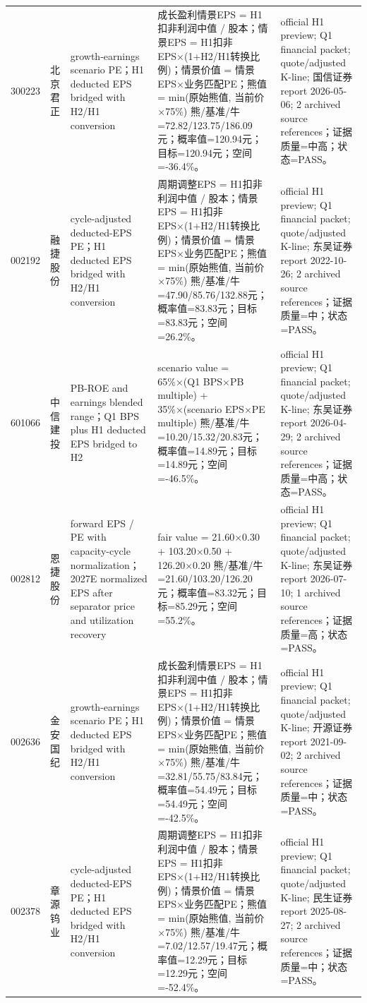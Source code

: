 \begin{longtable}{L{0.85cm}L{1.55cm}L{2.25cm}L{6.0cm}L{4.0cm}}
300223 & 北京君正 & growth-earnings scenario PE；H1 deducted EPS bridged with H2/H1 conversion & 成长盈利情景EPS = H1扣非利润中值 / 股本；情景EPS = H1扣非EPS×(1+H2/H1转换比例)；情景价值 = 情景EPS×业务匹配PE；熊值 = min(原始熊值, 当前价×75\%) 熊/基准/牛=72.82/123.75/186.09元；概率值=120.94元；目标=120.94元；空间=-36.4\%。 & official H1 preview; Q1 financial packet; quote/adjusted K-line; 国信证券 report 2026-05-06; 2 archived source references；证据质量=中高；状态=PASS。 \\
002192 & 融捷股份 & cycle-adjusted deducted-EPS PE；H1 deducted EPS bridged with H2/H1 conversion & 周期调整EPS = H1扣非利润中值 / 股本；情景EPS = H1扣非EPS×(1+H2/H1转换比例)；情景价值 = 情景EPS×业务匹配PE；熊值 = min(原始熊值, 当前价×75\%) 熊/基准/牛=47.90/85.76/132.88元；概率值=83.83元；目标=83.83元；空间=26.2\%。 & official H1 preview; Q1 financial packet; quote/adjusted K-line; 东吴证券 report 2022-10-26; 2 archived source references；证据质量=中；状态=PASS。 \\
601066 & 中信建投 & PB-ROE and earnings blended range；Q1 BPS plus H1 deducted EPS bridged to H2 & scenario value = 65\%×(Q1 BPS×PB multiple) + 35\%×(scenario EPS×PE multiple) 熊/基准/牛=10.20/15.32/20.83元；概率值=14.89元；目标=14.89元；空间=-46.5\%。 & official H1 preview; Q1 financial packet; quote/adjusted K-line; 东吴证券 report 2026-04-29; 2 archived source references；证据质量=中高；状态=PASS。 \\
002812 & 恩捷股份 & forward EPS / PE with capacity-cycle normalization；2027E normalized EPS after separator price and utilization recovery & fair value = 21.60×0.30 + 103.20×0.50 + 126.20×0.20 熊/基准/牛=21.60/103.20/126.20元；概率值=83.32元；目标=85.29元；空间=55.2\%。 & official H1 preview; Q1 financial packet; quote/adjusted K-line; 东吴证券 report 2026-07-10; 1 archived source references；证据质量=高；状态=PASS。 \\
002636 & 金安国纪 & growth-earnings scenario PE；H1 deducted EPS bridged with H2/H1 conversion & 成长盈利情景EPS = H1扣非利润中值 / 股本；情景EPS = H1扣非EPS×(1+H2/H1转换比例)；情景价值 = 情景EPS×业务匹配PE；熊值 = min(原始熊值, 当前价×75\%) 熊/基准/牛=32.81/55.75/83.84元；概率值=54.49元；目标=54.49元；空间=-42.5\%。 & official H1 preview; Q1 financial packet; quote/adjusted K-line; 开源证券 report 2021-09-02; 2 archived source references；证据质量=中；状态=PASS。 \\
002378 & 章源钨业 & cycle-adjusted deducted-EPS PE；H1 deducted EPS bridged with H2/H1 conversion & 周期调整EPS = H1扣非利润中值 / 股本；情景EPS = H1扣非EPS×(1+H2/H1转换比例)；情景价值 = 情景EPS×业务匹配PE；熊值 = min(原始熊值, 当前价×75\%) 熊/基准/牛=7.02/12.57/19.47元；概率值=12.29元；目标=12.29元；空间=-52.4\%。 & official H1 preview; Q1 financial packet; quote/adjusted K-line; 民生证券 report 2025-08-27; 2 archived source references；证据质量=中；状态=PASS。 \\

\end{longtable}
